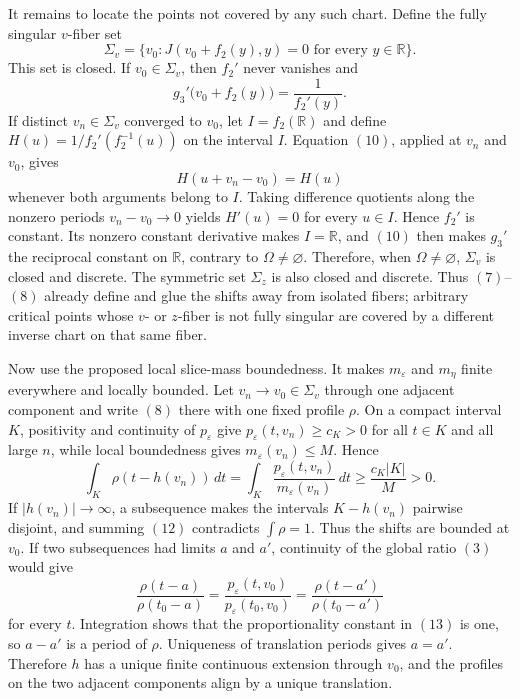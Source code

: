 It remains to locate the points not covered by any such chart.  Define the fully singular \(v\)-fiber set
\[
 \Sigma_v=\{v_0:J(v_0+f_2(y),y)=0\text{ for every }y\in\mathbb R\}.
\tag{9}
\]
This set is closed.  If \(v_0\in\Sigma_v\), then \(f_2'\) never vanishes and
\[
 g_3'\bigl(v_0+f_2(y)\bigr)=\frac{1}{f_2'(y)}.
\tag{10}
\]
If distinct \(v_n\in\Sigma_v\) converged to \(v_0\), let \(I=f_2(\mathbb R)\) and define \(H(u)=1/f_2'(f_2^{-1}(u))\) on the interval \(I\).  Equation \((10)\), applied at \(v_n\) and \(v_0\), gives
\[
 H(u+v_n-v_0)=H(u)
\tag{11}
\]
whenever both arguments belong to \(I\).  Taking difference quotients along the nonzero periods \(v_n-v_0\to0\) yields \(H'(u)=0\) for every \(u\in I\).  Hence \(f_2'\) is constant.  Its nonzero constant derivative makes \(I=\mathbb R\), and \((10)\) then makes \(g_3'\) the reciprocal constant on \(\mathbb R\), contrary to \(\Omega\ne\varnothing\).  Therefore, when \(\Omega\ne\varnothing\), \(\Sigma_v\) is closed and discrete.  The symmetric set \(\Sigma_z\) is also closed and discrete.  Thus \((7)\)--\((8)\) already define and glue the shifts away from isolated fibers; arbitrary critical points whose \(v\)- or \(z\)-fiber is not fully singular are covered by a different inverse chart on that same fiber.

Now use the proposed local slice-mass boundedness.  It makes \(m_\varepsilon\) and \(m_\eta\) finite everywhere and locally bounded.  Let \(v_n\to v_0\in\Sigma_v\) through one adjacent component and write \((8)\) there with one fixed profile \(\rho\).  On a compact interval \(K\), positivity and continuity of \(p_\varepsilon\) give \(p_\varepsilon(t,v_n)\ge c_K>0\) for all \(t\in K\) and all large \(n\), while local boundedness gives \(m_\varepsilon(v_n)\le M\).  Hence
\[
 \int_K\rho(t-h(v_n))\,dt
 =\int_K\frac{p_\varepsilon(t,v_n)}{m_\varepsilon(v_n)}\,dt
 \ge \frac{c_K|K|}{M}>0.
\tag{12}
\]
If \(|h(v_n)|\to\infty\), a subsequence makes the intervals \(K-h(v_n)\) pairwise disjoint, and summing \((12)\) contradicts \(\int\rho=1\).  Thus the shifts are bounded at \(v_0\).  If two subsequences had limits \(a\) and \(a'\), continuity of the global ratio \((3)\) would give
\[
 \frac{\rho(t-a)}{\rho(t_0-a)}
 =\frac{p_\varepsilon(t,v_0)}{p_\varepsilon(t_0,v_0)}
 =\frac{\rho(t-a')}{\rho(t_0-a')}
\tag{13}
\]
for every \(t\).  Integration shows that the proportionality constant in \((13)\) is one, so \(a-a'\) is a period of \(\rho\).  Uniqueness of translation periods gives \(a=a'\).  Therefore \(h\) has a unique finite continuous extension through \(v_0\), and the profiles on the two adjacent components align by a unique translation.

